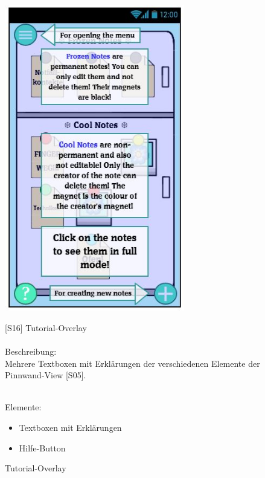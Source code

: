\documentclass[a4paper]{scrreprt}
\begin{document}
    	\begin{figure}[h!]
    		\begin{minipage}[t]{0.4\linewidth}
    			\flushright
    			\centering
    			\vspace{9mm}
    			\includegraphics[width=0.7\textwidth]{fridget_tutorial.JPG}
    			\caption{Tutorial-Overlay}
    			\label{fig:figure1}
    		\end{minipage}
    		\hspace{0.5cm}
    		\begin{minipage}[t]{0.55\linewidth}
    			\flushleft
    			\vspace{9mm}
    			{[}S16{]} Tutorial-Overlay\\
    			\hfill
    			\\
    			Beschreibung: \\
    			Mehrere Textboxen mit Erklärungen der  
    			verschiedenen Elemente der
    			Pinnwand-View {[}S05{]}.
    			
    			\hfill 
    			\\Elemente:\\
    			\begin{itemize}
    				\renewcommand\labelitemi{--}
    				\item Textboxen mit Erklärungen
    				\item Hilfe-Button
    				

\end{itemize}
\end{minipage}
\end{figure}
\end{document}
